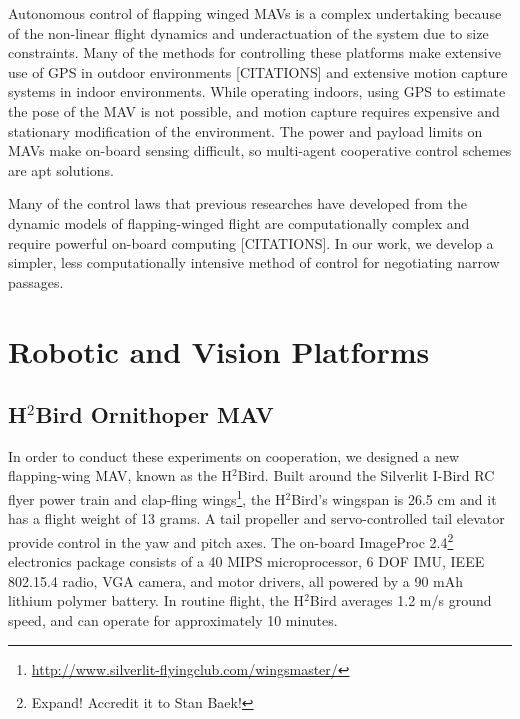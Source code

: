 \documentclass{aamas2013}
\begin{document}
Autonomous control of flapping winged MAVs is a complex undertaking because
of the non-linear flight dynamics and underactuation of the system due to size
constraints. Many of the methods for controlling these platforms make
extensive use of GPS in outdoor environments [CITATIONS] and extensive motion
capture systems in indoor environments. While operating indoors, using GPS to 
estimate the pose of the MAV is not possible, and motion capture requires expensive
and stationary modification of the environment. The power and payload limits on MAVs
make on-board sensing difficult, so multi-agent cooperative control schemes are 
apt solutions.

Many of the control laws that previous researches have developed from the 
dynamic models of flapping-winged flight are computationally complex and 
require powerful on-board computing [CITATIONS]. In our work, we develop a 
simpler, less computationally intensive method of control for negotiating 
narrow passages.

\section{Robotic and Vision Platforms}

\subsection{H$^2$Bird Ornithoper MAV}
In order to conduct these experiments on cooperation, we designed a new
flapping-wing MAV, known as the H$^2$Bird. Built around the Silverlit I-Bird 
RC flyer power train and clap-fling 
wings\footnote{\url{http://www.silverlit-flyingclub.com/wingsmaster/}}, 
the H$^2$Bird's wingspan is 26.5 cm and it has a flight weight of 13 grams. A 
tail propeller and servo-controlled tail elevator provide control in the yaw 
and pitch axes. The on-board ImageProc 2.4\footnote{Expand! Accredit it to Stan Baek!} 
electronics package consists of a 40 MIPS microprocessor, 6 DOF IMU, 
IEEE 802.15.4 radio, VGA camera, and motor drivers, all powered by a 90 mAh 
lithium polymer battery. In routine flight, the H$^2$Bird averages 1.2 m/s 
ground speed, and can operate for approximately 10 minutes.

\end{document}
